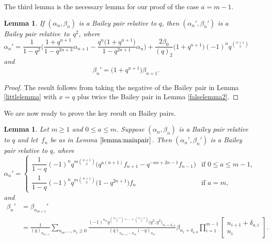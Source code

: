 \documentclass[pdftex]{sigma}
\newtheorem{Lemma}[Theorem]{Lemma}
\numberwithin{equation}{section}
\begin{document}
The third lemma is the necessary lemma for our proof of the case $a=m-1$.
\begin{Lemma} \label{falselemma3}
If $(\alpha_n,\beta_n)$ is a Bailey pair relative to $q$, then $(\alpha_n',\beta_n')$ is a Bailey pair relative~to~$q^2$, where
\begin{equation*} %
	\alpha_n' = \frac{1}{1-q^2} \biggl( \frac{1+q^{n+1}}{1-q^{2n+3}}\alpha_{n+1} - \frac{q^n\bigl(1+q^{n+1}\bigr)}{1-q^{2n+1}}\alpha_n \biggr) + \frac{2\beta_0}{(q)_2} \bigl(1+q^{n+1}\bigr)(-1)^nq^{\binom{n+1}{2}}
\end{equation*}
and
\begin{equation*} %
	\beta_n' = \bigl(1+q^{n+1}\bigr)\beta_{n+1}.
\end{equation*}
\end{Lemma}

\begin{proof}
The result follows from taking the negative of the Bailey pair in Lemma \ref{littlelemma} with $x=q$ plus twice the Bailey pair in Lemma \ref{falselemma2}.
\end{proof}


We are now ready to prove the key result on Bailey pairs.
\begin{Lemma} \label{lemma:falsepair}
Let $m \geq 1$ and $0 \leq a \leq m$. Suppose $(\alpha_n,\beta_n)$ is a Bailey pair relative to $q$ and let~$f_n$ be as in Lemma $\ref{lemma:mainpair}$. Then $(\alpha_n',\beta_n')$ is a Bailey pair relative to $q$, where
\begin{equation*} %
	\alpha_n' =
	\begin{cases}
		\dfrac{1}{1-q}(-1)^nq^{m\binom{n+1}{2}}\bigl(
		q^{a(n+1)}f_{n+1} -q^{-an+2n-1}f_{n-1}
		\bigr) & \text{if $0 \leq a \leq m-1$}, \\
		\dfrac{1}{1-q}(-1)^nq^{m \binom{n+1}{2}}\bigl(1-q^{2n+1}\bigr)f_n &\text{if $a=m$},
	\end{cases}
\end{equation*}
and
\begin{align}
		\beta_n' &{}= \beta_{n_{m+1}}' \label{eqn:falsepairbeta}\\
 &{}= \frac{1}{(q)_{n_{m+1}}} \sum_{n_m, \dots, n_1 \geq 0}\frac{(-1)^{n_m}q^{\binom{n_m+1}{2} + \cdots + \binom{n_1+1}{2}}\bigl(q^2;q^2\bigr)_{n_1+\delta_{a,0}}}{(q)_{n_{m+1}-n_m} (-q)_{n_m}} \beta_{n_1+\delta_{a,0}} \prod_{i=1}^{m-1} \begin{bmatrix} n_{i+1} + \delta_{a,i} \\ n_i \end{bmatrix}.
\nonumber
\end{align}
\end{Lemma}
\end{document}
